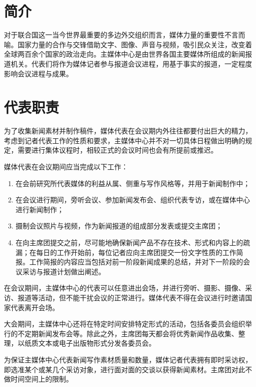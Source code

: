 \documentclass[a4paper,openany]{book}
\begin{document}
\section{简介}

对于联合国这一当今世界最重要的多边外交组织而言，媒体力量的重要性不言而喻。国家力量的合作与交锋借助文字、图像、声音与视频，吸引民众关注，改变着全球两百余个国家的政治走向。主媒体中心是由世界各国主要媒体所组成的新闻报道机关。代表们将作为媒体记者参与报道会议进程，用基于事实的报道，一定程度影响会议进程与成果。

\section{代表职责}

为了收集新闻素材并制作稿件，媒体代表在会议期内外往往都要付出巨大的精力，考虑到记者代表工作的性质和要求，主媒体中心并不对一切具体日程做出明确的规定，需要进行集体议程时，相较正式的会议时间也会有所提前或推迟。

媒体代表在会议期间应当完成以下工作：

\begin{enumerate}

\item 在会前研究所代表媒体的利益从属、侧重与写作风格等，并用于新闻制作中；

\item 在会议进行期间，旁听会议、参加新闻发布会、组织代表专访，或在媒体中心进行新闻制作；

\item 摄制会议照片与视频，作为新闻报道的组成部分发表或提交主席团；

\item 在向主席团提交之前，尽可能地确保新闻产品不存在技术、形式和内容上的疏漏；在每日的工作开始前，每位记者应向主席团提交一份文字性质的工作简报。工作简报的内容应当包括对前一阶段新闻成果的总结，并对下一阶段的会议采访与报道计划做出阐述。

\end{enumerate}

在会议期间，主媒体中心的代表可以任意进出会场，并进行旁听、摄影、摄像、采访、报道等活动，但不能干扰会议的正常进行。媒体代表不得在会议进行时邀请国家代表离开会场。

大会期间，主媒体中心还将在特定时间安排特定形式的活动，包括各委员会组织举行的不定期新闻发布会等。除此之外，主席团每天都会将优秀新闻作品收集、整理，以纸质文本或电子出版物形式分发各委员会。

为保证主媒体中心代表新闻写作素材质量和数量，媒体记者代表拥有即时采访权，即选准某个或某几个采访对象，进行面对面的交谈以获得新闻素材。主席团对此不做时间空间上的限制。
\end{document}
